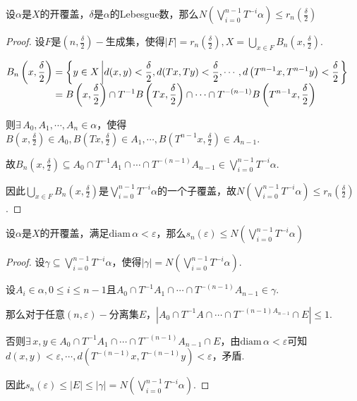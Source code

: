 \begin{lemma}{}
    设$\alpha$是$X$的开覆盖，$\delta$是$\alpha$的Lebesgue数，那么$N \left(\bigvee_{i=0}^{n-1}T^{-i}\alpha\right)\leq r_n \left(\frac{\delta}{2}\right)$
\end{lemma}
\begin{proof}
    设$F$是$\left(n,\frac{\delta}{2}\right)-$生成集，使得$|F|=r_n \left(\frac{\delta}{2}\right),X=\bigcup_{x\in F}B_n\left(x,\frac{\delta}{2}\right)$.\par
    $\setjot[-2]\begin{aligned}[t]
        B_n \left(x,\frac{\delta}{2}\right)&=\left\{y\in X\left|d(x,y)<\frac{\delta}{2},d(Tx,Ty)<\frac{\delta}{2},\cdots,d \left(T^{n-1}x,T^{n-1}y\right)<\frac{\delta}{2}\right.\right\} \\
        &=B\left(x,\frac{\delta}{2}\right)\cap T^{-1}B\left(Tx,\frac{\delta}{2}\right)\cap\cdots\cap T^{-(n-1)}B\left(T^{n-1}x,\frac{\delta}{2}\right)
    \end{aligned}$\par
    则$\exists\, A_0,A_1,\cdots,A_n\in\alpha$，使得$B\left(x,\frac{\delta}{2}\right)\in A_0,B\left(Tx,\frac{\delta}{2}\right)\in A_1,\cdots,B\left(T^{n-1}x,\frac{\delta}{2}\right)\in A_{n-1}$.\par
    故$B_n\left(x,\frac{\delta}{2}\right)\subseteq A_0\cap T^{-1}A_1\cap\cdots\cap T^{-(n-1)}A_{n-1}\in\bigvee_{i=0}^{n-1}T^{-i}\alpha$.\par
    因此$\bigcup_{x\in F}B_n\left(x,\frac{\delta}{2}\right)$是$\bigvee_{i=0}^{n-1}T^{-i}\alpha$的一个子覆盖，故$N\left(\bigvee_{i=0}^{n-1}T^{-i}\alpha\right)\leq r_n \left(\frac{\delta}{2}\right)$.
\end{proof}

\begin{lemma}{}
    设$\alpha$是$X$的开覆盖，满足$\mathrm{diam}\,\alpha<\varepsilon$，那么$s_n(\varepsilon)\leq N\left(\bigvee_{i=0}^{n-1}T^{-i}\alpha\right)$
\end{lemma}
\begin{proof}
    设$\gamma\subseteq \bigvee_{i=0}^{n-1}T^{-i}\alpha$，使得$|\gamma|=N\left(\bigvee_{i=0}^{n-1}T^{-i}\alpha\right)$.\par
    设$A_i\in\alpha,0\leq i\leq n-1$且$A_0\cap T^{-1}A_1\cap \cdots\cap T^{-(n-1)}A_{n-1}\in\gamma$.\par
    那么对于任意$(n,\varepsilon)-$分离集$E$，$|A_0\cap T^{-1}A\cap\cdots\cap T^{-(n-1)A_{n-1}}\cap E|\leq 1$.\par
    否则$\exists\, x,y\in A_0\cap T^{-1}A_1\cap\cdots\cap T^{-(n-1)}A_{n-1}\cap E$，由$\mathrm{diam}\, \alpha<\varepsilon$可知$d(x,y)<\varepsilon,\cdots,d(T^{-(n-1)}x,T^{-(n-1)}y)<\varepsilon$，矛盾.\par
    因此$s_n(\varepsilon)\leq |E|\leq |\gamma|=N\left(\bigvee_{i=0}^{n-1}T^{-i}\alpha\right)$.
\end{proof}

